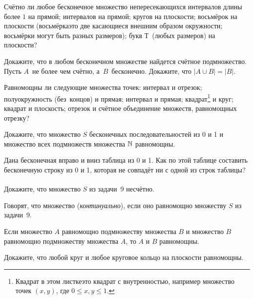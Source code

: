 \documentclass[a4paper,12pt]{article}
\begin{document}
Счётно ли любое бесконечное множество непересекающихся
 интервалов длины более $1$ на прямой;
 интервалов на прямой;
 кругов на плоскости;
 восьмёрок на плоскости (восьмёрка\т это две касающиеся внешним образом окружности; восьмёрки могут быть разных размеров);
 букв  Т\ (любых размеров) на плоскости?


\newpage

Докажите, что в любом бесконечном множестве найдется счётное подмножество.
Пусть $A$~не более чем счётно, а~$B$~бесконечно. Докажите, что $|A \cup B|=|B|$.




Равномощны ли следующие множества точек:
 интервал и отрезок;
 полуокружность (без~концов) и прямая;
 интервал и прямая;
 квадрат\footnote{Квадрат в этом листке\т это квадрат с внутренностью, например множество точек $(x,y)$, где $0\leq x, y\leq1$.} и круг;
 квадрат и плоскость;
 отрезок и счётное объединение множеств, равномощных отрезку?



Докажите, что множество $S$ бесконечных последовательностей из 0 и 1 и множество всех подмножеств множества $\mathbb{N}$ равномощны.



Дана бесконечная вправо и вниз таблица из 0 и 1. Как по этой таблице составить бесконечную строку из 0 и 1, которая не совпадёт ни с одной из строк таблицы?\\
\\
Докажите, что множество $S$ из задачи~9 несчётно.

Говорят, что множество  (\emph{континуально}), если оно равномощно множеству $S$ из задачи~9.

Если множество $A$ равномощно подмножеству множества $B$ и множество $B$ равномощно подмножеству множества $A$, то $A$ и $B$ равномощны.

Докажите, что любой круг и любое круговое кольцо на плоскости равномощны.
\end{document}

